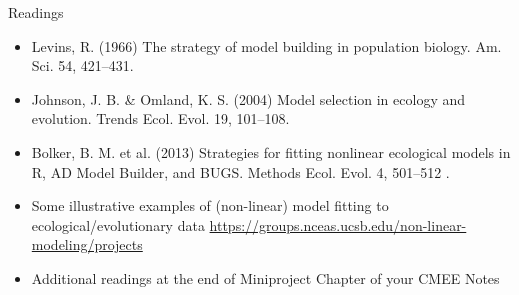 \documentclass[xcolor=x11names,compress]{beamer}
\renewcommand{\(}{\begin{columns}}
\renewcommand{\)}{\end{columns}}
\newcommand{\<}[1]{\begin{column}{#1}}
\renewcommand{\>}{\end{column}}
\begin{document}
\begin{frame}{Readings}

\begin{itemize}

\item Levins, R. (1966) The strategy of model building in population 
biology. Am. Sci. 54, 421--431.  

\item Johnson, J. B. \& Omland, K. S. (2004) Model selection in ecology 
and evolution. Trends Ecol. Evol. 19, 101--108. 

\item Bolker, B. M. et al.  (2013) Strategies for fitting nonlinear ecological models in R, AD Model Builder, and BUGS. Methods Ecol. Evol. 4, 501--512 .

\item Some illustrative examples of (non-linear) model fitting to 
ecological/evolutionary data 
\url{https://groups.nceas.ucsb.edu/non-linear-modeling/projects} 

\item Additional readings at the end of Miniproject Chapter of your CMEE Notes 
 
\end{itemize}
\end{frame}
\end{document}

